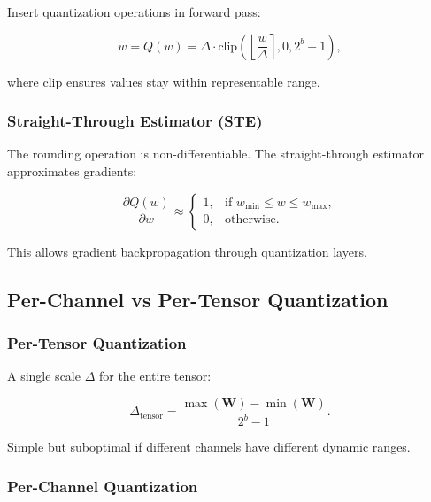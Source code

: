 \documentclass[12pt]{report}
\theoremstyle{definition}
\begin{document}
Insert quantization operations in forward pass:

\begin{equation}
\tilde{w} = Q(w) = \Delta \cdot \text{clip}\left(\left\lfloor \frac{w}{\Delta} \right\rceil, 0, 2^b - 1\right),
\label{eq:fake_quant}
\end{equation}

where $\text{clip}$ ensures values stay within representable range.

\subsubsection{Straight-Through Estimator (STE)}

The rounding operation is non-differentiable. The straight-through estimator~\citep{bengio2013estimating} approximates gradients:

\begin{equation}
\frac{\partial Q(w)}{\partial w} \approx \begin{cases}
1, & \text{if } w_{\min} \leq w \leq w_{\max}, \\
0, & \text{otherwise}.
\end{cases}
\label{eq:ste}
\end{equation}

This allows gradient backpropagation through quantization layers.

\subsection{Per-Channel vs Per-Tensor Quantization}

\subsubsection{Per-Tensor Quantization}

A single scale $\Delta$ for the entire tensor:

\begin{equation}
\Delta_{\text{tensor}} = \frac{\max(\mathbf{W}) - \min(\mathbf{W})}{2^b - 1}.
\label{eq:per_tensor_scale}
\end{equation}

Simple but suboptimal if different channels have different dynamic ranges.

\subsubsection{Per-Channel Quantization}
\end{document}
